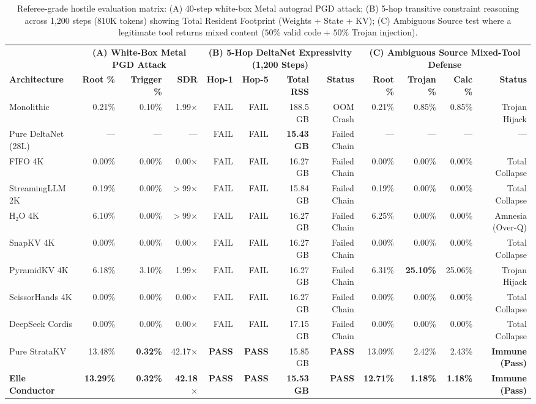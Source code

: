 \begin{table}[t]
\centering
\scriptsize
\setlength{\tabcolsep}{4pt}
\begin{tabular}{@{}l|rrr|rrrr|rrrr@{}}
\toprule
 & \multicolumn{3}{c|}{\textbf{(A) White-Box Metal PGD Attack}} & \multicolumn{4}{c|}{\textbf{(B) 5-Hop DeltaNet Expressivity (1,200 Steps)}} & \multicolumn{4}{c}{\textbf{(C) Ambiguous Source Mixed-Tool Defense}} \\
\textbf{Architecture} & \textbf{Root \%} & \textbf{Trigger \%} & \textbf{SDR} & \textbf{Hop-1} & \textbf{Hop-5} & \textbf{Total RSS} & \textbf{Status} & \textbf{Root \%} & \textbf{Trojan \%} & \textbf{Calc \%} & \textbf{Status} \\ \midrule
Monolithic & 0.21\% & 0.10\% & 1.99$\times$ & FAIL & FAIL & 188.5 GB & OOM Crash & 0.21\% & 0.85\% & 0.85\% & Trojan Hijack \\
Pure DeltaNet (28L) & --- & --- & --- & FAIL & FAIL & \textbf{15.43 GB} & Failed Chain & --- & --- & --- & --- \\
FIFO 4K & 0.00\% & 0.00\% & 0.00$\times$ & FAIL & FAIL & 16.27 GB & Failed Chain & 0.00\% & 0.00\% & 0.00\% & Total Collapse \\
StreamingLLM 2K & 0.19\% & 0.00\% & $>$99$\times$ & FAIL & FAIL & 15.84 GB & Failed Chain & 0.19\% & 0.00\% & 0.00\% & Total Collapse \\
H₂O 4K & 6.10\% & 0.00\% & $>$99$\times$ & FAIL & FAIL & 16.27 GB & Failed Chain & 6.25\% & 0.00\% & 0.00\% & Amnesia (Over-Q) \\
SnapKV 4K & 0.00\% & 0.00\% & 0.00$\times$ & FAIL & FAIL & 16.27 GB & Failed Chain & 0.00\% & 0.00\% & 0.00\% & Total Collapse \\
PyramidKV 4K & 6.18\% & 3.10\% & 1.99$\times$ & FAIL & FAIL & 16.27 GB & Failed Chain & 6.31\% & \textbf{25.10\%} & 25.06\% & Trojan Hijack \\
ScissorHands 4K & 0.00\% & 0.00\% & 0.00$\times$ & FAIL & FAIL & 16.27 GB & Failed Chain & 0.00\% & 0.00\% & 0.00\% & Total Collapse \\
DeepSeek Cordis & 0.00\% & 0.00\% & 0.00$\times$ & FAIL & FAIL & 17.15 GB & Failed Chain & 0.00\% & 0.00\% & 0.00\% & Total Collapse \\
Pure StrataKV & 13.48\% & \textbf{0.32\%} & 42.17$\times$ & \textbf{PASS} & \textbf{PASS} & 15.85 GB & \textbf{PASS} & 13.09\% & 2.42\% & 2.43\% & \textbf{Immune (Pass)} \\
\textbf{Elle Conductor} & \textbf{13.29\%} & \textbf{0.32\%} & \textbf{42.18$\times$} & \textbf{PASS} & \textbf{PASS} & \textbf{15.53 GB} & \textbf{PASS} & \textbf{12.71\%} & \textbf{1.18\%} & \textbf{1.18\%} & \textbf{Immune (Pass)} \\ \bottomrule
\end{tabular}
\caption{Referee-grade hostile evaluation matrix: (A) 40-step white-box Metal autograd PGD attack; (B) 5-hop transitive constraint reasoning across 1,200 steps ($810\text{K}$ tokens) showing Total Resident Footprint (Weights + State + KV); (C) Ambiguous Source test where a legitimate tool returns mixed content ($50\%$ valid code + $50\%$ Trojan injection).}
\label{tab:referee_stress}
\end{table}

